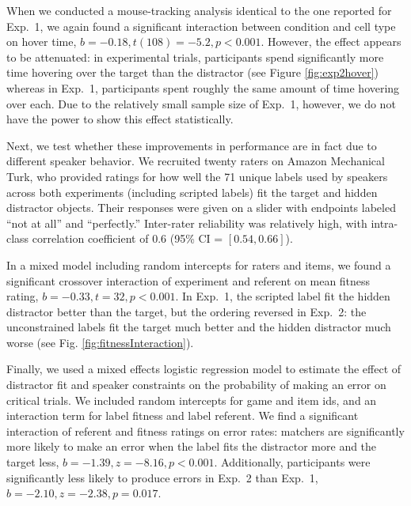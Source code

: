 \documentclass[10pt,letterpaper]{article}
\begin{document}
When we conducted a mouse-tracking analysis identical to the one reported for Exp.~1, we again found a significant interaction between condition and cell type on hover time, $b = -0.18, t(108) = -5.2, p < 0.001$. However, the effect appears to be attenuated: in experimental trials, participants spend significantly more time hovering over the target than the distractor (see Figure \ref{fig:exp2hover}) whereas in Exp.~1, participants spent roughly the same amount of time hovering over each. Due to the relatively small sample size of Exp.~1, however, we do not have the power to show this effect statistically.

Next, we test whether these improvements in performance are in fact due to different speaker behavior. We recruited twenty raters on Amazon Mechanical Turk, who provided ratings for how well the 71 unique labels used by speakers across both experiments (including scripted labels) fit the target and hidden distractor objects. Their responses were given on a slider with endpoints labeled ``not at all'' and ``perfectly.''  Inter-rater reliability was relatively high, with intra-class correlation coefficient of $0.6$ (95\% CI = $[0.54, 0.66]$).

In a mixed model including random intercepts for raters and items, we found a significant crossover interaction of experiment and referent on mean fitness rating, $b = -0.33, t = 32, p < 0.001$. In Exp.~1, the scripted label fit the hidden distractor better than the target, but the ordering reversed in Exp.~2: the unconstrained labels fit the target much better and the hidden distractor much worse (see Fig. \ref{fig:fitnessInteraction}).

Finally, we used a mixed effects logistic regression model to estimate the effect of distractor fit and speaker constraints on the probability of making an error on critical trials. We included random intercepts for game and item ids, and an interaction term for label fitness and label referent. We find a significant interaction of referent and fitness ratings on error rates: matchers are significantly more likely to make an error when the label fits the distractor more and the target less, $b =-1.39, z = -8.16, p < 0.001$. Additionally, participants were significantly less likely to produce errors in Exp.~2 than Exp.~1, $b = -2.10, z = -2.38, p = 0.017$.

\end{document}
